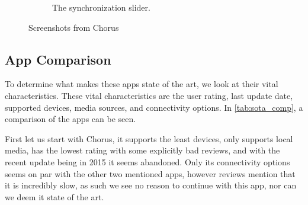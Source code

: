 \begin{figure}[h!]
\begin{subfigure}[b]{0.45\textwidth}
        \caption{The synchronization slider.}\label{fig:chorus_slider}
    \end{subfigure}
    \caption{Screenshots from Chorus}\label{fig:chorus_screenshots}
\end{figure}

\subsection{App Comparison}\label{ssec:app_comparison}
To determine what makes these apps state of the art, we look at their vital characteristics.
These vital characteristics are the user rating, last update date, supported devices, media sources, and connectivity options.
In \cref{tab:sota_comp}, a comparison of the apps can be seen.

First let us start with Chorus, it supports the least devices, only supports local media, has the lowest rating with some explicitly bad reviews, and with the recent update being in 2015 it seems abandoned.
Only its connectivity options seems on par with the other two mentioned apps, however reviews mention that it is incredibly slow, as such we see no reason to continue with this app, nor can we deem it state of the art.

